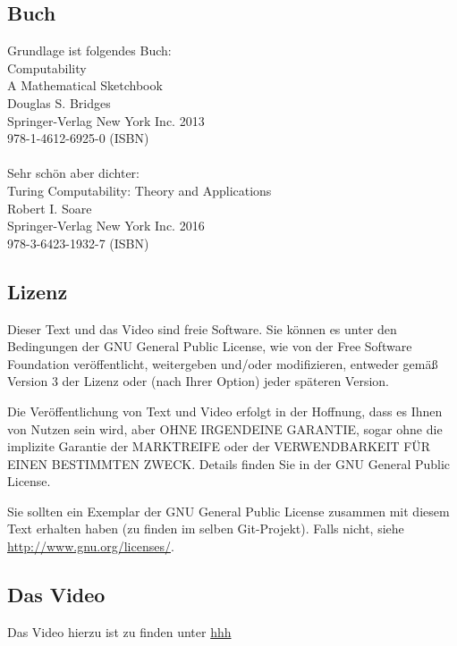 \documentclass[a4paper]{amsart}
\theoremstyle{definition}
\begin{document}
\subsection*{Buch}
Grundlage ist folgendes Buch:\\
Computability\\
A Mathematical Sketchbook\\
Douglas S. Bridges\\
Springer-Verlag New York Inc. 2013\\
978-1-4612-6925-0 (ISBN)
\\
\\
Sehr schön aber dichter:\\
Turing Computability: Theory and Applications\\
Robert I. Soare\\
Springer-Verlag New York Inc. 2016\\
978-3-6423-1932-7 (ISBN)

\subsection*{Lizenz}
Dieser Text und das Video sind freie Software. Sie können es unter den Bedingungen der
GNU General Public License, wie von der Free Software Foundation veröffentlicht, weitergeben
und/oder modifizieren, entweder gemäß Version 3 der Lizenz oder (nach Ihrer Option) jeder späteren Version.

Die Veröffentlichung von Text und Video erfolgt in der Hoffnung, dass es Ihnen von Nutzen sein wird,
aber OHNE IRGENDEINE GARANTIE, sogar ohne die implizite Garantie der MARKTREIFE oder der
VERWENDBARKEIT FÜR EINEN BESTIMMTEN ZWECK. Details finden Sie in der GNU General Public License.

Sie sollten ein Exemplar der GNU General Public License zusammen mit diesem Text erhalten haben
(zu finden im selben Git-Projekt).
Falls nicht, siehe \url{http://www.gnu.org/licenses/}.

\subsection*{Das Video}
Das Video hierzu ist zu finden unter
{\tiny
   \url{hhh}
}

\end{document}
